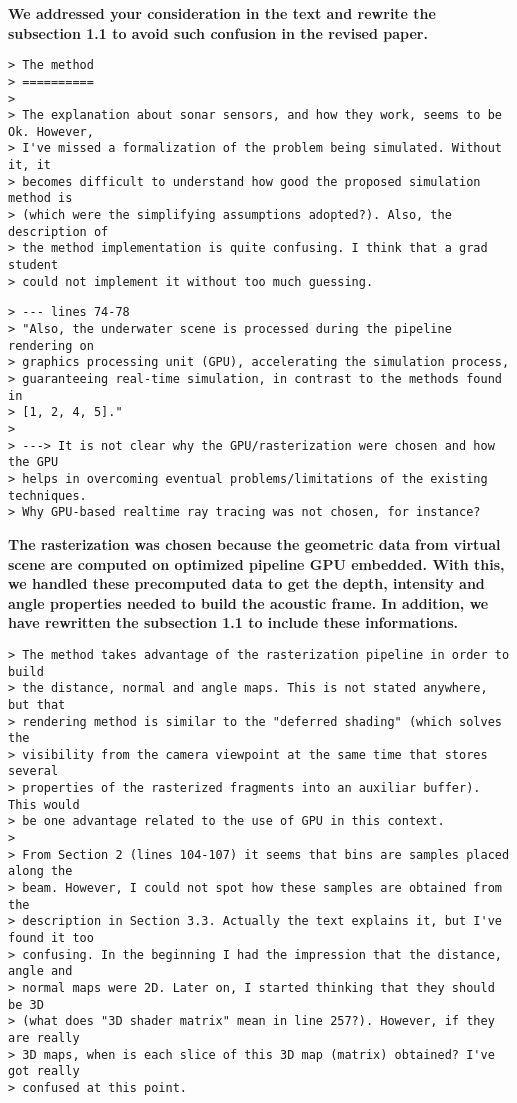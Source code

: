 \documentclass{article}
\begin{document}
\textbf{We addressed your consideration in the text and rewrite the
subsection 1.1 to avoid such confusion in the revised paper.}

\begin{verbatim}
> The method
> ==========
>
> The explanation about sonar sensors, and how they work, seems to be Ok. However,
> I've missed a formalization of the problem being simulated. Without it, it
> becomes difficult to understand how good the proposed simulation method is
> (which were the simplifying assumptions adopted?). Also, the description of
> the method implementation is quite confusing. I think that a grad student
> could not implement it without too much guessing.
\end{verbatim}


\begin{verbatim}
> --- lines 74-78
> "Also, the underwater scene is processed during the pipeline rendering on
> graphics processing unit (GPU), accelerating the simulation process,
> guaranteeing real-time simulation, in contrast to the methods found in
> [1, 2, 4, 5]."
>
> ---> It is not clear why the GPU/rasterization were chosen and how the GPU
> helps in overcoming eventual problems/limitations of the existing techniques.
> Why GPU-based realtime ray tracing was not chosen, for instance?
\end{verbatim}

\textbf{The rasterization was chosen because the geometric data from virtual
scene are computed on optimized pipeline GPU embedded. With this, we handled
these precomputed data to get the depth, intensity and angle properties needed
to build the acoustic frame. In addition, we have rewritten the subsection 1.1
to include these informations.}

\begin{verbatim}
> The method takes advantage of the rasterization pipeline in order to build
> the distance, normal and angle maps. This is not stated anywhere, but that
> rendering method is similar to the "deferred shading" (which solves the
> visibility from the camera viewpoint at the same time that stores several
> properties of the rasterized fragments into an auxiliar buffer). This would
> be one advantage related to the use of GPU in this context.
>
> From Section 2 (lines 104-107) it seems that bins are samples placed along the
> beam. However, I could not spot how these samples are obtained from the
> description in Section 3.3. Actually the text explains it, but I've found it too
> confusing. In the beginning I had the impression that the distance, angle and
> normal maps were 2D. Later on, I started thinking that they should be 3D
> (what does "3D shader matrix" mean in line 257?). However, if they are really
> 3D maps, when is each slice of this 3D map (matrix) obtained? I've got really
> confused at this point.
\end{verbatim}
\end{document}
